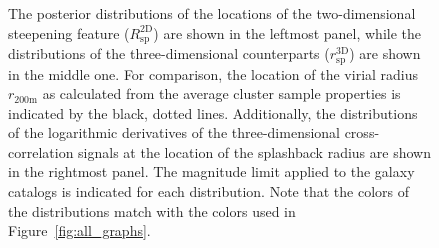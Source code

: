 \documentclass[iop, apjl, twocolappendix, numberedappendix]{emulateapj}
\begin{document}
\begin{figure}
\caption{The posterior distributions of the
locations of the two-dimensional steepening feature
($R_{\mathrm{sp}}^{\mathrm{2D}}$) are shown in the leftmost panel, while the
distributions of the three-dimensional counterparts
($r_{\mathrm{sp}}^{\mathrm{3D}}$) are shown in the middle one. 
For comparison, the location of the virial
radius $r_{\mathrm{200m}}$ as calculated from the average cluster
sample properties is indicated by the black, dotted lines.
Additionally, the distributions of the logarithmic derivatives of
the three-dimensional cross-correlation signals at the location of
the splashback radius are shown in the rightmost panel.
The magnitude limit applied to the galaxy catalogs is indicated for each
distribution. Note that the colors of the distributions match with
the colors used in Figure~\ref{fig:all_graphs}. }
   \label{fig:histograms} 
\end{figure}
\end{document}
